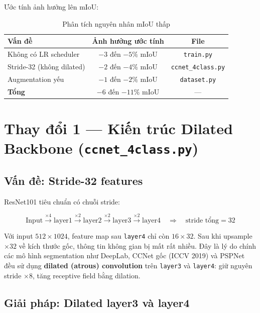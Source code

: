 \documentclass[12pt,a4paper]{article}
\begin{document}
Ước tính ảnh hưởng lên mIoU:

\begin{table}[H]
  \centering
  \caption{Phân tích nguyên nhân mIoU thấp}
  \begin{tabular}{lcc}
    \toprule
    \textbf{Vấn đề} & \textbf{Ảnh hưởng ước tính} & \textbf{File} \\
    \midrule
    Không có LR scheduler & $-3$ đến $-5\%$ mIoU & \texttt{train.py} \\
    Stride-32 (không dilated) & $-2$ đến $-4\%$ mIoU & \texttt{ccnet\_4class.py} \\
    Augmentation yếu & $-1$ đến $-2\%$ mIoU & \texttt{dataset.py} \\
    \midrule
    \textbf{Tổng} & \boldmath$-6$ đến $-11\%$ mIoU & — \\
    \bottomrule
  \end{tabular}
\end{table}

\section{Thay đổi 1 — Kiến trúc Dilated Backbone (\texttt{ccnet\_4class.py})}

\subsection{Vấn đề: Stride-32 features}

ResNet101 tiêu chuẩn có chuỗi stride:

\[
  \text{Input} \xrightarrow{\times4} \text{layer1}
               \xrightarrow{\times2} \text{layer2}
               \xrightarrow{\times2} \text{layer3}
               \xrightarrow{\times2} \text{layer4}
  \quad\Rightarrow\quad \text{stride tổng} = 32
\]

Với input $512\times1024$, feature map sau \texttt{layer4} chỉ còn $16\times32$.
Sau khi upsample $\times32$ về kích thước gốc, thông tin không gian bị mất rất nhiều.
Đây là lý do chính các mô hình segmentation như DeepLab, CCNet gốc (ICCV 2019) và
PSPNet đều sử dụng \textbf{dilated (atrous) convolution} trên \texttt{layer3} và
\texttt{layer4}: giữ nguyên stride $\times8$, tăng receptive field bằng dilation.

\subsection{Giải pháp: Dilated layer3 và layer4}
\end{document}
